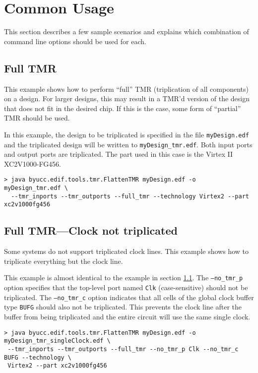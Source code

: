 \documentclass[english]{article}
\begin{document}
\section{Common Usage}
This section describes a few sample scenarios and explains which combination of
command line options should be used for each.

\subsection{Full TMR}
\label{subsec:fulltmr}
This example shows how to perform ``full'' TMR (triplication of all components) 
on a design. For larger designs, this may result in a TMR'd version of the 
design that does not fit in the desired chip. If this is the case, some form of 
``partial'' TMR should be used.

In this example, the design to be triplicated is specified in the file 
\texttt{myDesign.edf} and the triplicated design will be written to 
\texttt{myDesign\_tmr.edf}. Both input ports and output ports are triplicated. 
The part used in this case is the Virtex II XC2V1000-FG456.

\begin{verbatim}
> java byucc.edif.tools.tmr.FlattenTMR myDesign.edf -o myDesign_tmr.edf \
  --tmr_inports --tmr_outports --full_tmr --technology Virtex2 --part xc2v1000fg456
\end{verbatim}


\subsection{Full TMR---Clock not triplicated}
Some systems do not support triplicated clock lines. This example shows how to 
triplicate everything but the clock line.

This example is almost identical to the example in section 
\ref{subsec:fulltmr}. The \texttt{--no\_tmr\_p} option specifies that the 
top-level port named \texttt{Clk} (case-sensitive) should not be triplicated. 
The \texttt{--no\_tmr\_c} option indicates that all cells of the global clock 
buffer type \texttt{BUFG} should also not be triplicated. This prevents the 
clock line after the buffer from being triplicated and the entire circuit will 
use the same single clock.

\begin{verbatim}
> java byucc.edif.tools.tmr.FlattenTMR myDesign.edf -o myDesign_tmr_singleClock.edf \
 --tmr_inports --tmr_outports --full_tmr --no_tmr_p Clk --no_tmr_c BUFG --technology \
 Virtex2 --part xc2v1000fg456
\end{verbatim}
\end{document}
